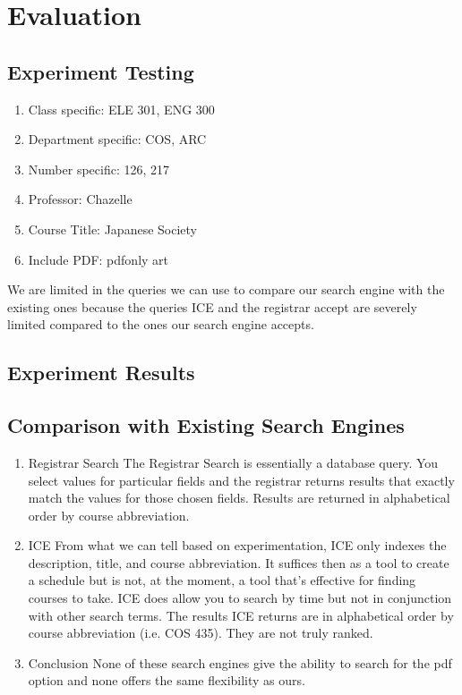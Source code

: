 \documentclass[12pt,letterpaper]{article}
\begin{document}
\section{Evaluation}
\subsection{Experiment Testing}
\begin{enumerate}
\item Class specific: ELE 301, ENG 300
\item Department specific: COS, ARC
\item Number specific: 126, 217
\item Professor: Chazelle
\item Course Title: Japanese Society
\item Include PDF: pdfonly art
\end{enumerate}

We are limited in the queries we can use to compare our search engine with the existing ones because the queries ICE and the registrar accept are severely limited compared to the ones our search engine accepts.
\subsection{Experiment Results}
\subsection{Comparison with Existing Search Engines}
\begin{enumerate}
\item Registrar Search
  The Registrar Search is essentially a database query. You select values for particular fields and the registrar returns results that exactly match the values for those chosen fields. Results are returned in alphabetical order by course abbreviation. 
  
\item ICE
  From what we can tell based on experimentation, ICE only indexes the description, title, and course abbreviation. It suffices then as a tool to create a schedule but is not, at the moment, a tool that's effective for finding courses to take. ICE does allow you to search by time but not in conjunction with other search terms. The results ICE returns are in alphabetical order by course abbreviation (i.e. COS 435). They are not truly ranked.  
  
\item Conclusion
  None of these search engines give the ability to search for the pdf option and none offers the same flexibility as ours.
\end{enumerate}
\end{document}
